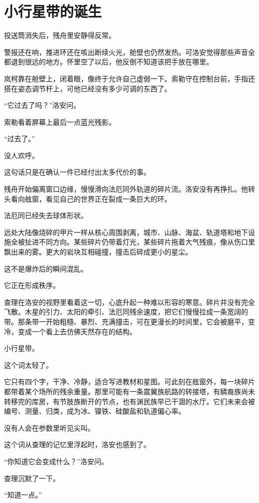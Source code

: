 \chapter{小行星带的诞生}

投送筒消失后，残舟里安静得反常。

警报还在响，推进环还在咳出断续火光，舱壁也仍然发热。可洛安觉得那些声音全都退到很远的地方。怀里空了以后，他反倒不知道该把手放在哪里。

岚柯靠在舱壁上，闭着眼，像终于允许自己虚弱一下。索勒守在控制台前，手指还搭在姿态调节杆上，可他已经没有多少可调的东西了。

“它过去了吗？”洛安问。

索勒看着屏幕上最后一点蓝光残影。

“过去了。”

没人欢呼。

这句话只是在确认一件已经付出太多代价的事。

残舟开始偏离窗口边缘，慢慢滑向法厄同外轨道的碎片流。洛安没有再挣扎。他转头看向舷窗，看见自己的世界正在裂成一条巨大的环。

法厄同已经失去球体形状。

远处大陆像烧碎的甲片一样从核心周围剥离，城市、山脉、海盆、轨道塔和地下设施全被扯进不同方向。某些碎片仍带着灯光，某些碎片拖着大气残痕，像从伤口里飘出来的雾。更大的岩块互相碰撞，撞击后碎成更小的星尘。

这不是爆炸后的瞬间混乱。

它正在形成秩序。

查理在洛安的视野里看着这一切，心底升起一种难以形容的寒意。碎片并没有完全飞散。木星的引力、太阳的牵引、法厄同残余速度，把它们慢慢拉成一条宽阔的带。那条带一开始粗糙、暴烈、充满撞击，可在更漫长的时间里，它会被磨平，变冷，变成一个看上去仿佛天然存在的结构。

小行星带。

这个词太轻了。

它只有四个字，干净、冷静，适合写进教材和星图。可此刻在舷窗外，每一块碎片都带着某个场所的残余重量。那里可能有一条震翼族航路的转接塔，有鳞裔族尚未转移完的库房，有节肢族断开的节点，也有渊民族早已干涸的水厅。它们未来会被编号、测量、归类，成为冰、镍铁、硅酸盐和轨道偏心率。

没有人会在参数里听见尖叫。

这个词从查理的记忆里浮起时，洛安也感到了。

“你知道它会变成什么？”洛安问。

查理沉默了一下。

“知道一点。”

